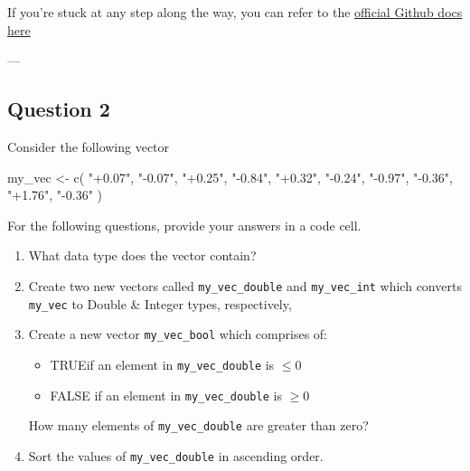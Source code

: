 \documentclass[
  letterpaper,
  DIV=11,
  numbers=noendperiod]{scrartcl}
\newenvironment{Shaded}{\begin{snugshade}}{\end{snugshade}}
\newcommand{\FunctionTok}[1]{\textcolor[rgb]{0.28,0.35,0.67}{#1}}
\newcommand{\NormalTok}[1]{\textcolor[rgb]{0.00,0.23,0.31}{#1}}
\newcommand{\OtherTok}[1]{\textcolor[rgb]{0.00,0.23,0.31}{#1}}
\newcommand{\StringTok}[1]{\textcolor[rgb]{0.13,0.47,0.30}{#1}}
\providecommand{\tightlist}{%
  \setlength{\itemsep}{0pt}\setlength{\parskip}{0pt}}\usepackage{longtable,booktabs,array}
\begin{document}
If you're stuck at any step along the way, you can refer to the
\href{https://docs.github.com/en/pull-requests/collaborating-with-pull-requests/proposing-changes-to-your-work-with-pull-requests/creating-a-pull-request-from-a-fork}{official
Github docs here}

---

\hypertarget{question-2}{%
\subsection{Question 2}\label{question-2}}

\begin{tcolorbox}[enhanced jigsaw, opacitybacktitle=0.6, opacityback=0, colframe=quarto-callout-tip-color-frame, toptitle=1mm, colbacktitle=quarto-callout-tip-color!10!white, colback=white, left=2mm, coltitle=black, title=\textcolor{quarto-callout-tip-color}{\faLightbulb}\hspace{0.5em}{30 points}, breakable, bottomtitle=1mm, rightrule=.15mm, titlerule=0mm, leftrule=.75mm, bottomrule=.15mm, toprule=.15mm, arc=.35mm]

\end{tcolorbox}

Consider the following vector

\begin{Shaded}
\begin{Highlighting}[]
\NormalTok{my\_vec }\OtherTok{\textless{}{-}} \FunctionTok{c}\NormalTok{(}
    \StringTok{"+0.07"}\NormalTok{,}
    \StringTok{"{-}0.07"}\NormalTok{,}
    \StringTok{"+0.25"}\NormalTok{,}
    \StringTok{"{-}0.84"}\NormalTok{,}
    \StringTok{"+0.32"}\NormalTok{,}
    \StringTok{"{-}0.24"}\NormalTok{,}
    \StringTok{"{-}0.97"}\NormalTok{,}
    \StringTok{"{-}0.36"}\NormalTok{,}
    \StringTok{"+1.76"}\NormalTok{,}
    \StringTok{"{-}0.36"}
\NormalTok{)}
\end{Highlighting}
\end{Shaded}

For the following questions, provide your answers in a code cell.

\begin{enumerate}
\def\labelenumi{\arabic{enumi}.}
\item
  What data type does the vector contain?
\item
  Create two new vectors called \texttt{my\_vec\_double} and
  \texttt{my\_vec\_int} which converts \texttt{my\_vec} to Double \&
  Integer types, respectively,
\item
  Create a new vector \texttt{my\_vec\_bool} which comprises of:

  \begin{itemize}
  \tightlist
  \item
    TRUEif an element in \texttt{my\_vec\_double} is \(\le 0\)
  \item
    FALSE if an element in \texttt{my\_vec\_double} is \(\ge 0\)
  \end{itemize}

  How many elements of \texttt{my\_vec\_double} are greater than zero?
\item
  Sort the values of \texttt{my\_vec\_double} in ascending order.
\end{enumerate}
\end{document}
